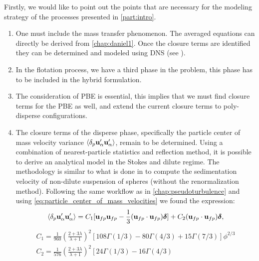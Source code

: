 Firstly,  we would like to point out the points that are necessary for the modeling strategy of the processes presented in \ref{part:intro}.
\begin{enumerate}
    \item One must include the mass transfer phenomenon.
    The averaged equations can directly be derived from \ref{chap:daniel1}.
    Once the closure terms are identified  they can be determined and modeled using DNS (see \citet{hidman2023assessing}). 
    \item In the flotation process, we have a third phase in the problem, this phase has to be included in the hybrid formulation. 
    \item The consideration of PBE is essential, this implies that we must find closure terms for the PBE as well, and extend the current closure terms to poly-disperse configurations. 
    \item The closure terms of the disperse phase, specifically the particle center of mass velocity variance $\left<\delta_p \textbf{u}_\alpha'\textbf{u}_\alpha'\right>$, remain to be determined. 
    Using a combination of nearest-particle statistics and reflection method, it is possible to derive an analytical model in the Stokes and dilute regime. 
    The methodology is similar to what is done in \citet{zhang2021ensemble} to compute the sedimentation velocity of non-dilute suspension of spheres (without the renormalization method). 
    Following the same workflow as in \ref{chap:pseudoturbulence} and using \ref{eq:particle_center_of_mass_velocities} we found the expression: 
    \begin{equation*}
        \left<\delta_p \textbf{u}_\alpha'\textbf{u}_\alpha'\right>
        = 
        C_1[\textbf{u}_{fp}\textbf{u}_{fp} - \frac{1}{3}(\textbf{u}_{fp}\cdot \textbf{u}_{fp})\bm\delta] 
        + C_2(\textbf{u}_{fp}\cdot \textbf{u}_{fp})\bm\delta,
    \end{equation*}
    \begin{align}
      C_1 = \frac{1}{960}\left(\frac{2+3\lambda}{\lambda+1}\right)^2 \left[
        108\Gamma(1/3)
        - 80\Gamma (4/3)
        +15\Gamma(7/3)
      \right]\phi^{2/3}\\
      C_2 = \frac{1}{576}\left(
        \frac{2+3\lambda}{\lambda+1}\right)^2 \left[
        24\Gamma(1/3)
        - 16\Gamma (4/3)

\end{align}
\end{enumerate}
